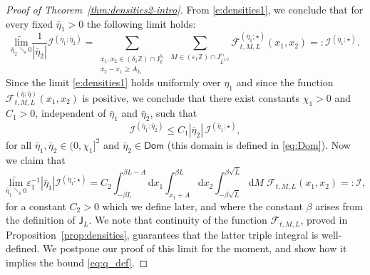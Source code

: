 \documentclass[oneside,final,11pt]{amsart}
\theoremstyle{definition}
\renewcommand{\d}{\mathrm{d}}
\newcommand{\Dom}{\mathsf{Dom}}
\newcommand{\mylim}[1]{\underset{#1}{\wt{\mathrm{lim}}}}
\newcommand{\bJ}{\mathsf{J}}
\newcommand{\zz}{\mathbb{Z}}
\newcommand{\dens}{\CF}
\newcommand{\1}[1]{\mathbf{1}_{#1}}
\newcommand{\eps}{\varepsilon}
\newcommand{\wt}{\widetilde}
\newcommand{\CI}{\mathcal{I}}
\newcommand{\CF}{\mathcal{F}}
\numberwithin{equation}{section}
\begin{document}
\begin{proof}[Proof of Theorem~\ref{thm:densities2-intro}]
From \eqref{e:densities1}, we conclude that for every fixed $\bar \eta_1 > 0$ the following limit holds:
\begin{equation}\label{eq:limit_to_integrals1}
\mylim{\bar \eta_2 \searrow 0} \frac{1}{|\bar \eta_2|} \CI^{(\bar \eta_1; \bar \eta_2)} = \sum_{\substack{x_1, x_2 \in (\delta_1 \zz) \cap \bJ_{ L}^{\delta_1} \\ x_2 - x_1 \geq A_{\delta_1}}} \sum_{M \in (\eps_1 \zz) \cap \bJ_{\bar L^{1/2}}^{\eps_1}} \dens^{(\overline\eta_1; \star)}_{t, M, L}(x_1, x_2)=:\CI^{(\bar \eta_1; \star)}.
\end{equation}
Since the limit \eqref{e:densities1} holds uniformly over $\eta_1$ and since the function $\dens^{(\overline\eta; \overline\eta)}_{t, M, L}(x_1, x_2)$ is positive, we conclude that there exist constants $\chi_1 > 0$ and $C_1 > 0$, independent of $\bar \eta_1$ and $\bar \eta_2$, such that
\begin{equation}\label{eq:I1_bound}
\CI^{(\bar \eta_1; \bar \eta_2)} \leq C_1 |\bar \eta_2|\, \CI^{(\bar \eta_1; \star)},
\end{equation}
for all $\bar \eta_1, \bar \eta_2 \in (0, \chi_1]^2$ and $\bar \eta_2 \in \Dom$ (this domain is defined in \eqref{eq:Dom}). Now we claim that
\begin{equation}\label{eq:limit_to_integrals2}
\mylim{\bar \eta_1 \searrow 0} \eps_1^{-1} |\bar \eta_1| \CI^{(\bar \eta_1; \star)} = C_2 \int_{-\beta L}^{\beta L - A} \d x_1 \int_{x_1 + A}^{\beta L} \d x_2 \int_{-\beta \sqrt{\bar L}}^{\beta \sqrt{\bar L}} \d M\; \dens_{t, M, L}(x_1, x_2)=:\CI,
\end{equation}
for a constant $C_2 > 0$ which we define later, and where the constant $\beta$ arises from the definition of $\bJ_{ L}$. We note that continuity of the function $\dens_{t, M, L}$, proved in Proposition~\ref{prop:densities}, guarantees that the latter triple integral is well-defined. We postpone our proof of this limit for the moment, and show how it implies the bound \eqref{eq:q_def}.


\end{proof}
\end{document}

